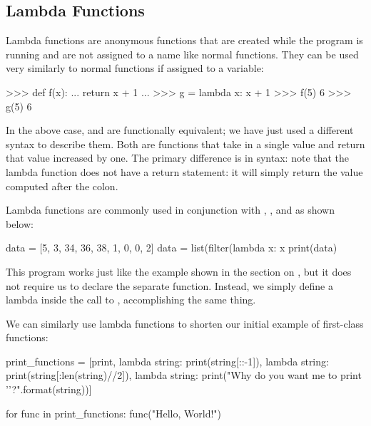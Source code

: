 \documentclass[11pt]{cselabheader}
\begin{document}
\subsection{Lambda Functions}
\label{subsec:lambda}
Lambda functions are anonymous functions that are created while the program is
running and are not assigned to a name like normal functions. They can be used
very similarly to normal functions if assigned to a variable:

\begin{pyconcode}
>>> def f(x):
...   return x + 1
... 
>>> g = lambda x: x + 1
>>> f(5)
6
>>> g(5)
6
\end{pyconcode}

In the above case,  and  are functionally equivalent;
we have just used a different syntax to describe them. 
Both are functions that take in a single value and return that value increased
by one. The primary difference is in syntax: note that the lambda function does
not have a return statement: it will simply return the value computed after the
colon.

Lambda functions are commonly used in conjunction with ,
, and  as shown below:

\begin{python3code}
data = [5, 3, 34, 36, 38, 1, 0, 0, 2]
data = list(filter(lambda x: x %
print(data)
\end{python3code}

\begin{verbatimcode}
[34, 36, 38, 0, 0, 2]
\end{verbatimcode}

This program works just like the example shown in the section on
, but it does not require us to declare the separate
 function. Instead, we simply define a lambda inside the call
to , accomplishing the same thing.

We can similarly use lambda functions to shorten our initial example of
first-class functions:

\begin{python3code}
print_functions = [print,
    lambda string: print(string[::-1]),
    lambda string: print(string[:len(string)//2]),
    lambda string: print("Why do you want me to print '{}'?".format(string))]

for func in print_functions:
    func("Hello, World!")
\end{python3code}
\end{document}
